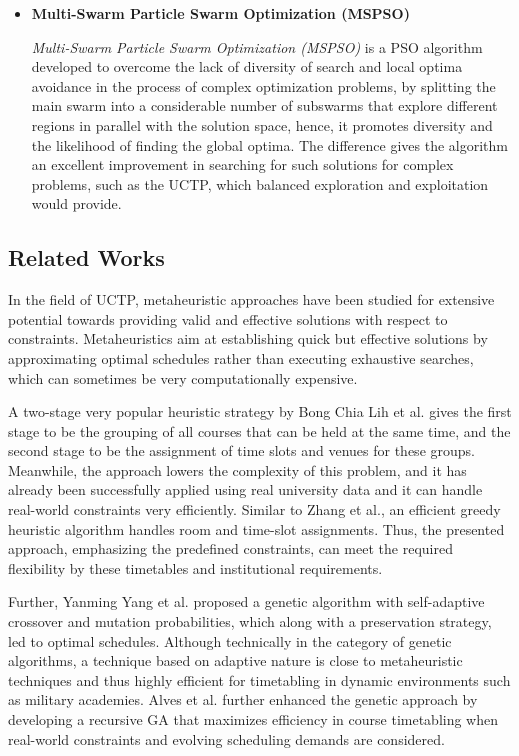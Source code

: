 \documentclass{article}
\newenvironment{subs}
  {\adjustwidth{3em}{0pt}}
  {\endadjustwidth}
\begin{document}
\begin{subs}
\begin{itemize}
    \item[] \textbf{Multi-Swarm Particle Swarm Optimization (MSPSO)} 
    
    \textit{Multi-Swarm Particle Swarm Optimization (MSPSO)} is a PSO algorithm developed to overcome the lack of diversity of search and local optima avoidance in the process of complex optimization problems, by splitting the main swarm into a considerable number of subswarms that explore different regions in parallel with the solution space, hence, it promotes diversity and the likelihood of finding the global optima. \cite{blackwell2004multi} The difference gives the algorithm an excellent improvement in searching for such solutions for complex problems, such as the UCTP, which balanced exploration and exploitation would provide. \cite{XIA2018126} \cite{Liu2023-pso} 

\end{itemize}

\subsection{Related Works}
\label{subsec:relatedworks}

In the field of UCTP, metaheuristic approaches have been studied for extensive potential towards providing valid and effective solutions with respect to constraints. Metaheuristics aim at establishing quick but effective solutions by approximating optimal schedules rather than executing exhaustive searches, which can sometimes be very computationally expensive.

A two-stage very popular heuristic strategy by Bong Chia Lih et al. \cite{Lih2018-km} gives the first stage to be the grouping of all courses that can be held at the same time, and the second stage to be the assignment of time slots and venues for these groups. Meanwhile, the approach lowers the complexity of this problem, and it has already been successfully applied using real university data and it can handle real-world constraints very efficiently. Similar to Zhang et al., \cite{Zhang2014-ak} an efficient greedy heuristic algorithm handles room and time-slot assignments. Thus, the presented approach, emphasizing the predefined constraints, can meet the required flexibility by these timetables and institutional requirements.

Further, Yanming Yang et al. \cite{Yang2017-ly} proposed a genetic algorithm with self-adaptive crossover and mutation probabilities, which along with a preservation strategy, led to optimal schedules. Although technically in the category of genetic algorithms, a technique based on adaptive nature is close to metaheuristic techniques and thus highly efficient for timetabling in dynamic environments such as military academies. Alves et al. \cite{Alves2018-ar} further enhanced the genetic approach by developing a recursive GA that maximizes efficiency in course timetabling when real-world constraints and evolving scheduling demands are considered.


\end{subs}
\end{document}
